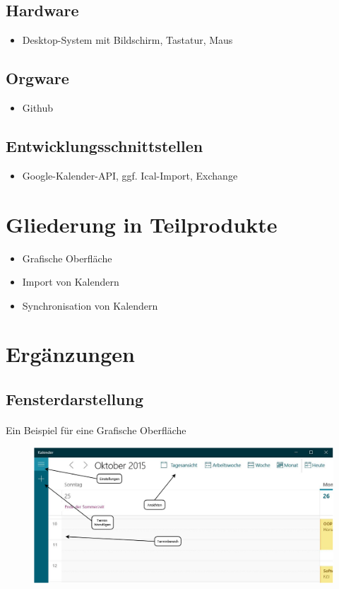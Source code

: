 \documentclass[a4paper]{article}
\begin{document}
    \subsection{Hardware}
	      \begin{itemize}
	      	\item Desktop-System mit Bildschirm, Tastatur, Maus
	      \end{itemize}
    \subsection{Orgware}
	      \begin{itemize}
					\item Github
	      \end{itemize}
    \subsection{Entwicklungsschnittstellen}
	      \begin{itemize}
	      	\item Google-Kalender-API, ggf. Ical-Import, Exchange
	      \end{itemize}

  \section{Gliederung in Teilprodukte}
    \begin{itemize}
      \item Grafische Oberfläche
		  \item Import von Kalendern
		  \item Synchronisation von Kalendern
    \end{itemize}
  \section{Ergänzungen}
  	\subsection{Fensterdarstellung}
  	\paragraph{}
  	Ein Beispiel für eine Grafische Oberfläche
  	
  	
	\begin{figure}
		\centering
		\includegraphics[width=0.9\linewidth]{Fensterdarstellung}
		\caption{}
		\label{Fensterdarstellung}
	\end{figure}
\end{document}
